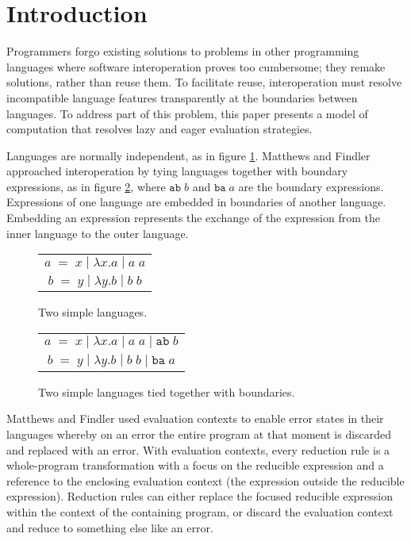 \section{Introduction}

Programmers forgo existing solutions to problems in other programming languages where software interoperation proves too cumbersome; they remake solutions, rather than reuse them. To facilitate reuse, interoperation must resolve incompatible language features transparently at the boundaries between languages. To address part of this problem, this paper presents a model of computation that resolves lazy and eager evaluation strategies.

Languages are normally independent, as in figure \ref{figsim}. Matthews and Findler \cite{matthews07} approached interoperation by tying languages together with boundary expressions, as in figure \ref{figtie}, where $\mathtt{ab} \; b$ and $\mathtt{ba} \; a$ are the boundary expressions. Expressions of one language are embedded in boundaries of another language. Embedding an expression represents the exchange of the expression from the inner language to the outer language.

\begin{figure}[htb]
\onehalfspacing
\centering
\begin{tabular}{c}
$a \; = \; x \; | \; \lambda x.a \; | \; a \; a$ \\
$b \; = \; y \; | \; \lambda y.b \; | \; b \; b$
\end{tabular}
\caption{Two simple languages.}
\label{figsim}
\end{figure}

\begin{figure}[htb]
\onehalfspacing
\centering
\begin{tabular}{c}
$a \; = \; x \; | \; \lambda x.a \; | \; a \; a \; | \; \mathtt{ab} \; b$ \\
$b \; = \; y \; | \; \lambda y.b \; | \; b \; b \; | \; \mathtt{ba} \; a$
\end{tabular}
\caption{Two simple languages tied together with boundaries.}
\label{figtie}
\end{figure}

Matthews and Findler used evaluation contexts to enable error states in their languages whereby on an error the entire program at that moment is discarded and replaced with an error. With evaluation contexts, every reduction rule is a whole-program transformation with a focus on the reducible expression and a reference to the enclosing evaluation context (the expression outside the reducible expression). Reduction rules can either replace the focused reducible expression within the context of the containing program, or discard the evaluation context and reduce to something else like an error.

